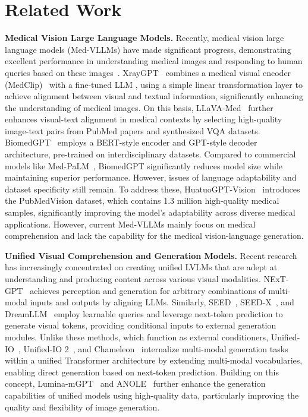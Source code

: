 \section{Related Work}
\label{Related Work}
\noindent\textbf{Medical Vision Large Language Models.} Recently, medical vision large language models (Med-VLLMs) have made significant progress, demonstrating excellent performance in understanding medical images and responding to human queries based on these images~\cite{zhou2023survey,tian2023role}. XrayGPT~\cite{thawkar2023xraygpt} combines a medical visual encoder (MedClip)~\cite{wang2022medclip} with a fine-tuned LLM , using a simple linear transformation layer to achieve alignment between visual and textual information, significantly enhancing the understanding of medical images. 
On this basis, LLaVA-Med~\cite{li2024llava} further enhances visual-text alignment in medical contexts by selecting high-quality image-text pairs from PubMed papers and synthesized VQA datasets. BiomedGPT~\cite{luo2024biomedgpt} employs a BERT-style encoder and GPT-style decoder architecture, pre-trained on interdisciplinary datasets. Compared to commercial models like Med-PaLM~\cite{singhal2023large}, BiomedGPT significantly reduces model size while maintaining superior performance.
However, issues of language adaptability and dataset specificity still remain. To address these, HuatuoGPT-Vision~\cite{chen2024huatuogpt} introduces the PubMedVision dataset, which contains 1.3 million high-quality medical samples, significantly improving the model's adaptability across diverse medical applications. However, current Med-VLLMs mainly focus on medical comprehension and lack the capability for the  medical vision-language generation. 

\noindent\textbf{Unified Visual Comprehension and Generation Models.}
Recent research has increasingly concentrated on creating unified LVLMs that are adept at understanding and producing content across various visual modalities.
NExT-GPT~\cite{wu2023next} achieves perception and generation for arbitrary combinations of multi-modal inputs and outputs by aligning LLMs. Similarly, SEED~\cite{ge2023planting}, SEED-X~\cite{ge2024seed}, and DreamLLM~\cite{dong2023dreamllm} employ learnable queries and leverage next-token prediction to generate visual tokens, providing conditional inputs to external generation modules. Unlike these methods, which function as external conditioners, Unified-IO~\cite{lu2022unified}, Unified-IO 2~\cite{lu2024unified}, and Chameleon~\cite{team2024chameleon} internalize multi-modal generation tasks within a unified Transformer architecture by extending multi-modal vocabularies, enabling direct generation based on next-token prediction. Building on this concept, Lumina-mGPT~\cite{liu2024lumina} and ANOLE~\cite{chern2024anole} further enhance the generation capabilities of unified models using high-quality data, particularly improving the quality and flexibility of image generation. 
